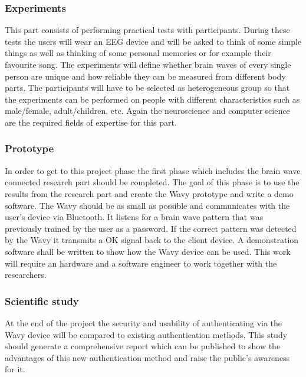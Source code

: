 \subsubsection{Experiments}
This part consists of performing practical tests with participants. During these tests the users will wear an EEG device and will be asked to think of some simple things as well as thinking of some personal memories or for example their favourite song. The experiments will define whether brain waves of every single person are unique and how reliable they can be measured from different body parts. The participants will have to be selected as heterogeneous group so that the experiments can be performed on people with different characteristics such as male/female, adult/children, etc. Again the neuroscience and computer science are the required fields of expertise for this part.

\subsubsection{Prototype}
In order to get to this project phase the first phase which includes the brain wave connected research part should be completed. The goal of this phase is to use the results from the research part and create the Wavy prototype and write a demo software. The Wavy should be as small as possible and communicates with the user's device via Bluetooth. It listens for a brain wave pattern that was previously trained by the user as a password. If the correct pattern was detected by the Wavy it transmits a OK signal back to the client device. A demonstration software shall be written to show how the Wavy device can be used. This work will require an hardware and a software engineer to work together with the researchers.

\subsubsection{Scientific study}
At the end of the project the security and usability of authenticating via the Wavy device will be compared to existing authentication methods. This study should generate a comprehensive report which can be published to show the advantages of this new authentication method and raise the public's awareness for it.

